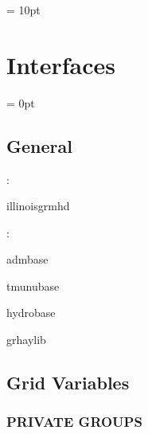 \documentclass{article}
\begin{document}
\vspace{0.5cm}\parskip = 10pt 

\section{Interfaces} 


\parskip = 0pt

\vspace{3mm} \subsection*{General}

: 

illinoisgrmhd
\vspace{2mm}

: 

admbase

tmunubase

hydrobase

grhaylib
\vspace{2mm}
\subsection*{Grid Variables}
\vspace{5mm}\subsubsection{PRIVATE GROUPS}

\vspace{5mm}
\end{document}
